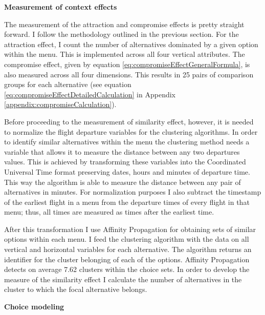 \documentclass[a4paper,12pt]{article}
\begin{document}
\textbf{Measurement of context effects}

The measurement of the attraction and compromise effects is pretty straight forward. I follow the methodology outlined in the previous section. For the attraction effect, I count the number of alternatives dominated by a given option within the menu. This is implemented across all four vertical attributes. The compromise effect, given by equation \ref{eq:compromiseEffectGeneralFormula}, is also measured across all four dimensions. This results in 25 pairs of comparison groups for each alternative (see equation \ref{eq:compromiseEffectDetailedCalculation} in Appendix \ref{appendix:compromiseCalculation}). 

Before proceeding to the measurement of similarity effect, however, it is needed to normalize the flight departure variables for the clustering algorithms. In order to identify similar alternatives within the menu the clustering method needs a variable that allows it to measure the distance between any two departures values. This is achieved by transforming these variables into the Coordinated Universal Time format preserving dates, hours and minutes of departure time. This way the algorithm is able to measure the distance between any pair of alternatives in minutes. For normalization purposes I also subtract the timestamp of the earliest flight in a menu from the departure times of every flight in that menu; thus, all times are measured as times after the earliest time.

After this transformation I use Affinity Propagation for obtaining sets of similar options within each menu. I feed the clustering algorithm with the data on all vertical and horizontal variables for each alternative. The algorithm returns an identifier for the cluster belonging of each of the options. Affinity Propagation detects on average 7.62 clusters within the choice sets. In order to develop the measure of the similarity effect I calculate the number of alternatives in the cluster to which the focal alternative belongs.

\textbf{Choice modeling}
\end{document}
